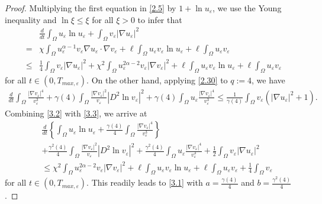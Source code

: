 \documentclass[12pt]{article}
\theoremstyle{plain}
\theoremstyle{definition}
\numberwithin{equation}{section}
\begin{document}
\begin{proof}
   Multiplying the first equation in \eqref{2.5} by $1+\ln u_{\varepsilon}$, we use the Young inequality and $\ln \xi \leqslant \xi$ for all $\xi>0$ to infer
   that
\begin{align}\label{3.2}
& \frac{d}{dt} \int_{\Omega} u_{\varepsilon} \ln u_{\varepsilon}+\int_{\Omega} v_{\varepsilon}\left|\nabla u_{\varepsilon}\right|^2\nonumber \\
=& \chi \int_{\Omega} u_{\varepsilon}^{\alpha-1} v_{\varepsilon} \nabla u_{\varepsilon} \cdot \nabla v_{\varepsilon}+ \ell\int_{\Omega}
u_{\varepsilon} v_{\varepsilon} \ln u_{\varepsilon} + \ell\int_{\Omega} u_{\varepsilon} v_{\varepsilon}\nonumber\\
\leq &  \frac{1}{4} \int_{\Omega} v_{\varepsilon}\left|\nabla u_{\varepsilon}\right|^2+ \chi^2 \int_{\Omega} u_{\varepsilon}^{2\alpha-2}
v_{\varepsilon}\left|\nabla v_{\varepsilon}\right|^2 +\ell\int_{\Omega} u_{\varepsilon} v_{\varepsilon} \ln u_{\varepsilon}+\ell\int_{\Omega}
u_{\varepsilon} v_{\varepsilon}
\end{align}
for all $t \in(0, T_{max, \varepsilon})$. On the other hand, applying \eqref{2.30} to $q:=4$, we have
\begin{align}\label{3.3}
    \frac{d}{dt}\int_{\Omega}\frac{|\nabla v_{\varepsilon}|^4}{v_{\varepsilon}^{3}}+\gamma(4)\int_{\Omega}\frac{|\nabla
    v_{\varepsilon}|^{2}}{v_{\varepsilon}}|D^2\ln{v_{\varepsilon}}|^2+\gamma(4)\int_{\Omega}u_{\varepsilon}\frac{|\nabla
    v_{\varepsilon}|^4}{v_{\varepsilon}^{3}}\leq \frac{1}{\gamma(4)}\int_{\Omega}v_{\varepsilon}(|\nabla u_{\varepsilon}|^{2}+1).
\end{align}
Combining \eqref{3.2} with \eqref{3.3}, we arrive at
\begin{align*}
&\frac{d}{dt}\left\{\int_{\Omega} u_{\varepsilon} \ln u_{\varepsilon}+\frac{\gamma(4)}{4}\int_{\Omega} \frac{\left|\nabla
v_{\varepsilon}\right|^4}{v_{\varepsilon}^3}\right\}\nonumber
\\
&+\frac{\gamma^2(4)}{4}\int_{\Omega}\frac{|\nabla
v_{\varepsilon}|^{2}}{v_{\varepsilon}}|D^2\ln{v_{\varepsilon}}|^2+\frac{\gamma^2(4)}{4}\int_{\Omega}u_{\varepsilon}\frac{|\nabla
v_{\varepsilon}|^4}{v_{\varepsilon}^3}+\frac{1}{2}\int_{\Omega}v_{\varepsilon}|\nabla u_{\varepsilon}|^2 \nonumber
    \\
 &\leq \chi^2\int_{\Omega}u_{\varepsilon}^{2\alpha-2}v_{\varepsilon}|\nabla v_{\varepsilon}|^2+\ell\int_{\Omega} u_{\varepsilon} v_{\varepsilon}
 \ln u_{\varepsilon}+\ell\int_{\Omega}u_{\varepsilon}v_{\varepsilon}+\frac{1}{4}\int_{\Omega}v_{\varepsilon}
\end{align*}
for all $t \in(0, T_{max, \varepsilon})$. This readily leads to \eqref{3.1} with $a=\frac{\gamma(4)}{4}$ and
 $b=\frac{\gamma^2(4)}{4}$.
\end{proof}
\end{document}
